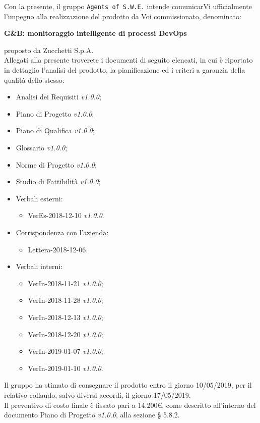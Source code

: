 \documentclass[11pt, a4paper]{letter} %
\begin{document}
\begin{letter}
Con la presente, il gruppo \texttt{Agents of S.W.E.} intende comunicarVi ufficialmente l'impegno alla realizzazione del prodotto da Voi commissionato, denominato:
\begin{center}
	\textbf{G\&B: monitoraggio intelligente di processi DevOps}
\end{center}
proposto da Zucchetti S.p.A.\\
Allegati alla presente troverete i documenti di seguito elencati, in cui è riportato in dettaglio l'analisi del prodotto, la pianificazione ed i criteri a garanzia della qualità dello stesso:
\begin{itemize}
	\item Analisi dei Requisiti \textit{v1.0.0};
	\item Piano di Progetto \textit{v1.0.0};
	\item Piano di Qualifica \textit{v1.0.0};
	\item Glossario \textit{v1.0.0};
	\item Norme di Progetto \textit{v1.0.0};	
	\item Studio di Fattibilità \textit{v1.0.0};
	\item Verbali esterni: 
		\begin{itemize}
			\item VerEs-2018-12-10 \textit{v1.0.0}.
		\end{itemize}
	\item Corrispondenza con l'azienda: 
		\begin{itemize}
			\item Lettera-2018-12-06.
		\end{itemize}
	\item Verbali interni: 
		\begin{itemize}
			\item VerIn-2018-11-21 \textit{v1.0.0};
			\item VerIn-2018-11-28 \textit{v1.0.0};
			\item VerIn-2018-12-13 \textit{v1.0.0};
			\item VerIn-2018-12-20 \textit{v1.0.0};
			\item VerIn-2019-01-07 \textit{v1.0.0};
			\item VerIn-2019-01-10 \textit{v1.0.0}.
		\end{itemize}
\end{itemize}
Il gruppo ha stimato di consegnare il prodotto entro il giorno 10/05/2019, per il relativo collaudo, salvo diversi accordi, il giorno 17/05/2019.\\  
Il preventivo di costo finale è fissato pari a 14.200€, come descritto all'interno del documento Piano di Progetto \textit{v1.0.0}, alla sezione § 5.8.2.\\

\end{letter}
\end{document}

